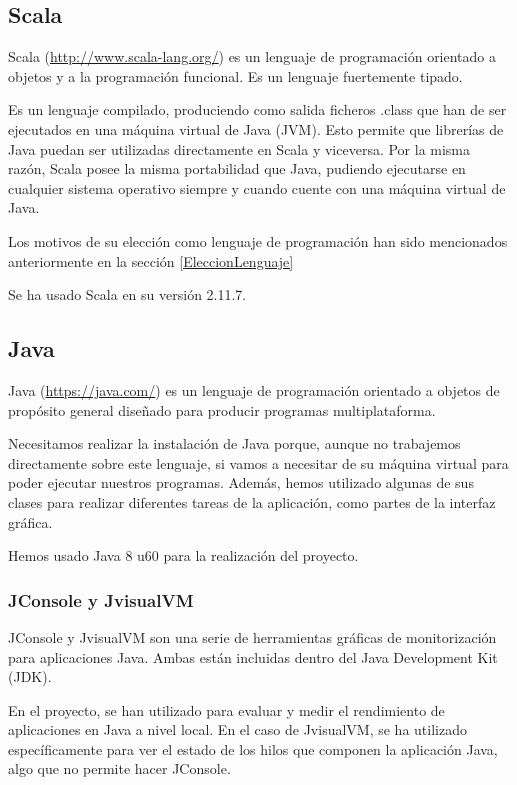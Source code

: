

\subsection{Scala}

Scala (\url{http://www.scala-lang.org/}) es un lenguaje de programación orientado a objetos y a la programación funcional. Es un lenguaje fuertemente tipado.

Es un lenguaje compilado, produciendo como salida ficheros .class que han de ser ejecutados en una máquina virtual de Java (JVM). Esto permite que librerías de Java puedan ser utilizadas directamente en Scala y viceversa. Por la misma razón, Scala posee la misma portabilidad que Java, pudiendo ejecutarse en cualquier sistema operativo siempre y cuando cuente con una máquina virtual de Java. 

Los motivos de su elección como lenguaje de programación han sido mencionados anteriormente en la sección \ref{EleccionLenguaje}

Se ha usado Scala en su versión 2.11.7.

\subsection{Java}

Java (\url{https://java.com/}) es un lenguaje de programación orientado a objetos de propósito general diseñado para producir programas multiplataforma.

Necesitamos realizar la instalación de Java porque, aunque no trabajemos directamente sobre este lenguaje, si vamos a necesitar de su máquina virtual para poder ejecutar nuestros programas. Además, hemos utilizado algunas de sus clases para realizar diferentes tareas de la aplicación, como partes de la interfaz gráfica.

Hemos usado Java 8 u60 para la realización del proyecto.

\subsubsection{JConsole y JvisualVM}\label{DefJConsole}\label{DefJvisualVM}

JConsole y JvisualVM son una serie de herramientas gráficas de monitorización para aplicaciones Java. Ambas están incluidas dentro del Java Development Kit (JDK).

En el proyecto, se han utilizado para evaluar y medir el rendimiento de aplicaciones en Java a nivel local. En el caso de JvisualVM, se ha utilizado específicamente para ver el estado de los hilos que componen la aplicación Java, algo que no permite hacer JConsole.

